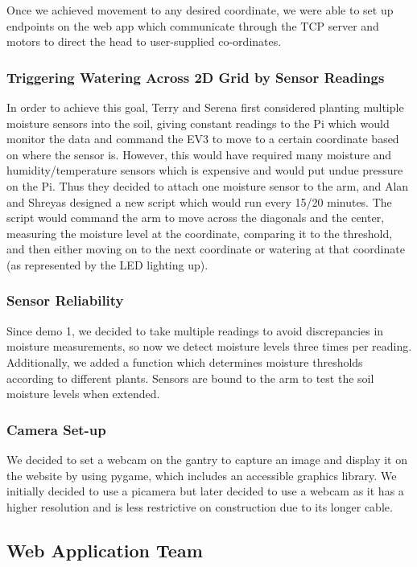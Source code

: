 \documentclass{article}
\begin{document}
Once we achieved movement to any desired coordinate, we were able to set up endpoints on the web app which communicate through the TCP server and motors to direct the head to user-supplied co-ordinates. 

\subsubsection{Triggering Watering Across 2D Grid by Sensor Readings}
In order to achieve this goal, Terry and Serena first considered planting multiple moisture sensors into the soil, giving constant readings to the Pi which would monitor the data and command the EV3 to move to a certain coordinate based on where the sensor is. However, this would have required many moisture and humidity/temperature sensors which is expensive and would put undue pressure on the Pi. Thus they decided to attach one moisture sensor to the arm, and Alan and Shreyas designed a new script which would run every 15/20 minutes. The script would command the arm to move across the diagonals and the center, measuring the moisture level at the coordinate, comparing it to the threshold, and then either moving on to the next coordinate or watering at that coordinate (as represented by the LED lighting up).

\subsubsection{Sensor Reliability}

Since demo 1, we decided to take multiple readings to avoid discrepancies in moisture measurements, so now we detect moisture levels three times per reading. Additionally, we added a function which determines moisture thresholds according to different plants. Sensors are bound to the arm to test the soil moisture levels when extended.

\subsubsection{Camera Set-up}
We decided to set a webcam on the gantry to capture an image and display it on the website by using pygame, which includes an accessible graphics library. We initially decided to use a picamera but later decided to use a webcam as it has a higher resolution and is less restrictive on construction due to its longer cable.

\subsection{Web Application Team}
\end{document}
